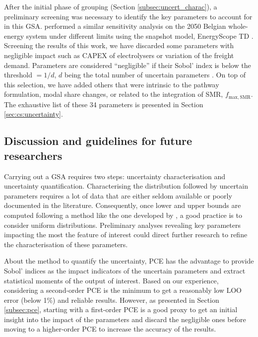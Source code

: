 After the initial phase of grouping (Section \ref{subsec:uncert_charac}), a preliminary screening was necessary to identify the key parameters to account for in this \gls{GSA}. \citet{rixhon2021role} performed a similar sensitivity analysis on the 2050 Belgian whole-energy system under different  limits using the snapshot model, EnergyScope TD \cite{limpens2019energyscope}. Screening the results of this work, we have discarded some parameters with negligible impact such as CAPEX of electrolysers or variation of the freight demand. Parameters are considered ``negligible'' if their Sobol' index is below the threshold $=1/d$, $d$ being the total number of uncertain parameters \cite{Turati2017}. On top of this selection, we have added others that were intrinsic to the pathway formulation, \eg modal share changes, or related to the integration of \gls{SMR}, $f_{\mathrm{max,SMR}}$. The exhaustive list of these 34 parameters is presented in Section \ref{sec:cs:uncertainty}.

\subsection{Discussion and guidelines for future researchers}
\label{subsec:meth:UQ:discussion}
Carrying out a \acrfull{GSA} requires two steps: uncertainty characterisation and uncertainty quantification. Characterising the distribution followed by uncertain parameters requires a lot of data that are either seldom available or poorly documented in the literature. Consequently, once lower and upper bounds are computed following a method like the one developed by \citet{Moret2017}, a good practice is to consider uniform distributions. Preliminary analyses revealing key parameters impacting the most the feature of interest could direct further research to refine the characterisation of these parameters.

About the method to quantify the uncertainty, \gls{PCE} has the advantage to provide Sobol' indices as the impact indicators of the uncertain parameters and extract statistical moments of the output of interest. Based on our experience, considering a second-order \gls{PCE} is the minimum to get a reasonably low \gls{LOO} error (below 1\%) and reliable results. However, as presented in Section \ref{subsec:pce}, starting with a first-order \gls{PCE} is a good proxy to get an initial insight into the impact of the parameters and discard the negligible ones before moving to a higher-order \gls{PCE} to increase the accuracy of the results.

